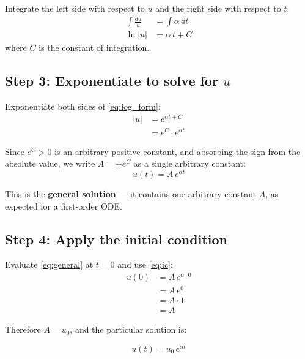 \documentclass[11pt]{article}
\begin{document}
Integrate the left side with respect to $u$ and the right side with respect to $t$:
\begin{align}
  \int \frac{du}{u} &= \int \alpha\,dt \\[6pt]
  \ln|u| &= \alpha\,t + C
  \label{eq:log_form}
\end{align}
where $C$ is the constant of integration.

\subsection{Step 3: Exponentiate to solve for $u$}

Exponentiate both sides of \eqref{eq:log_form}:
\begin{align}
  |u| &= e^{\alpha t + C} \\[6pt]
      &= e^C \cdot e^{\alpha t}
\end{align}

Since $e^C > 0$ is an arbitrary positive constant, and absorbing the sign from the absolute value,
we write $A = \pm e^C$ as a single arbitrary constant:
\begin{equation}
  u(t) = A\,e^{\alpha t}
  \label{eq:general}
\end{equation}

This is the \textbf{general solution} --- it contains one arbitrary constant $A$,
as expected for a first-order ODE.

\subsection{Step 4: Apply the initial condition}

Evaluate \eqref{eq:general} at $t = 0$ and use \eqref{eq:ic}:
\begin{align}
  u(0) &= A\,e^{\alpha \cdot 0} \\[6pt]
       &= A\,e^0 \\[6pt]
       &= A \cdot 1 \\[6pt]
       &= A
\end{align}

Therefore $A = u_0$, and the particular solution is:

\begin{tcolorbox}[colback=green!5, colframe=green!50!black, title=Analytical Solution (General IC)]
\begin{equation}
  \boxed{u(t) = u_0\,e^{\alpha t}}
  \label{eq:solution}
\end{equation}
\end{tcolorbox}
\end{document}
